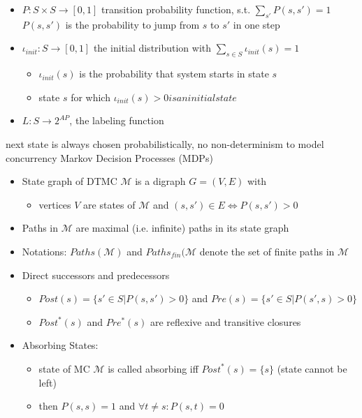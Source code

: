 \documentclass[a4paper, 10pt]{article}
\begin{document}
\begin{mdframed}
\begin{itemize}
    \item $P:S\times S\to[0,1]$ transition probability function, s.t. $\sum_{s'}P(s,s')=1$ \\
    $P(s,s')$ is the probability to jump from $s$ to $s'$ in one step
    \item $\iota_{init}:S\to[0,1]$ the initial distribution with $\sum_{s\in S}\iota_{init}(s)=1$
    \begin{itemize}
        \item $\iota_{init}(s)$ is the probability that system starts in state $s$
        \item state $s$ for which $\iota_{init}(s)>0 is an initial state$
    \end{itemize}
    \item $L:S\to 2^{AP}$, the labeling function
\end{itemize}
next state is always chosen probabilistically, no non-determinism to model concurrency \follows Markov Decision Processes (MDPs)
\begin{itemize}
    \item State graph of DTMC $\mathcal{M}$ is a digraph $G=(V,E)$ with
    \begin{itemize}
        \item vertices $V$ are states of $\mathcal{M}$ and $(s,s')\in E \iff P(s,s')>0$
    \end{itemize}
    \item Paths in $\mathcal{M}$ are maximal (i.e. infinite) paths in its state graph
    \item Notations: $Paths(\mathcal{M})$ and $Paths_{fin}(\mathcal{M}$ denote the set of finite paths in $\mathcal{M}$
    \item Direct successors and predecessors
    \begin{itemize}
        \item $Post(s)=\{s'\in S|P(s,s')>0\}$ and $Pre(s)=\{s'\in S|P(s',s)>0\}$
        \item $Post^*(s)$ and $Pre^*(s)$ are reflexive and transitive closures
    \end{itemize}
    \item Absorbing States:
    \begin{itemize}
        \item state of MC $\mathcal{M}$ is called absorbing iff $Post^*(s)=\{s\}$ {\tiny (state cannot be left)}
        \item then $P(s,s)=1$ and $\forall t\not=s:P(s,t)=0$
    \end{itemize}

\end{itemize}
\end{mdframed}
\end{document}
